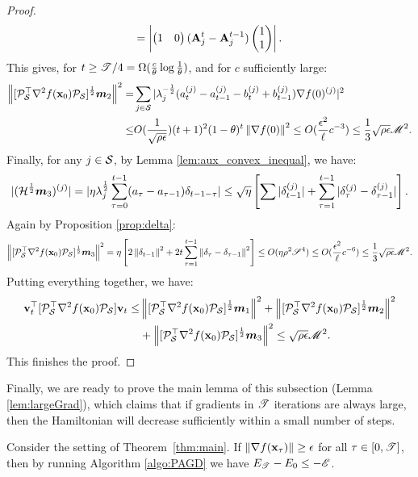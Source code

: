 \begin{proof}
\begin{align*}
= \abs{\pmat{1 & 0}  (\A_j^t -\A_j^{t-1})  \pmat{1 \\ 1}}.
\end{align*}
This gives, for $t\ge \utime/4 = \Omega(\frac{c}{\theta}\log\frac{1}{\theta})$, and
for $c$ sufficiently large:
\begin{align*}
\norm{[\proj_\S\trans \hess f(\x_0) \proj_\S]^{\frac{1}{2}}\m_2}^2 
=& \sum_{j \in \S} |\lambda_j^{-\frac{1}{2}} (a^{(j)}_t -a^{(j)}_{t-1} - b^{(j)}_t +b^{(j)}_{t-1} )  \grad f(0)^{(j)}|^2 \\
\le& O(\frac{1}{\sqrt{\rho\epsilon}})(t+1)^2(1-\theta)^t \norm{\grad f(0)}^2 \le O(\frac{\epsilon^2}{\ell}c^{-3}) \le \frac{1}{3}\sqrt{\rho\epsilon}\umom^2.
\end{align*}
Finally, for any $j \in \S$, by Lemma \ref{lem:aux_convex_inequal}, we have:
\begin{equation*}
|(\H^{\frac{1}{2}}\m_3)^{(j)}| = |\eta\lambda_j^{\frac{1}{2}}\sum_{\tau = 0}^{t-1}(a_\tau - a_{\tau -1}) \delta_{t-1-\tau}|
\le \sqrt{\eta} \left[\sum|\delta^{(j)}_{t-1}|+  \sum_{\tau=1}^{t-1} |\delta^{(j)}_\tau - \delta^{(j)}_{\tau-1}|\right].
\end{equation*}
Again by Proposition \ref{prop:delta}:
\begin{align*}
\norm{[\proj_\S\trans \hess f(\x_0) \proj_\S]^{\frac{1}{2}}\m_3}^2 
= \eta \left[2\norm{\delta_{t-1}}^2 + 2t\sum_{\tau = 1}^{t-1}\norm{\delta_\tau- \delta_{\tau-1}}^2 \right]
\le O(\eta\rho^2\uspace^4) \le O(\frac{\epsilon^2}{\ell}c^{-6}) \le \frac{1}{3}\sqrt{\rho\epsilon}\umom^2.
\end{align*}
Putting everything together, we have:
\begin{align*}
\v_t\trans [\proj_\S\trans \hess f(\x_0) \proj_\S] \v_t \le& 
\norm{[\proj_\S\trans \hess f(\x_0) \proj_\S]^{\frac{1}{2}}\m_1}^2
+ \norm{[\proj_\S\trans \hess f(\x_0) \proj_\S]^{\frac{1}{2}}\m_2}^2\\
&+ \norm{[\proj_\S\trans \hess f(\x_0) \proj_\S]^{\frac{1}{2}}\m_3}^2
\le \sqrt{\rho\epsilon}\umom^2.
\end{align*}
This finishes the proof.
\end{proof}


Finally, we are ready to prove the main lemma of this subsection (Lemma \ref{lem:largeGrad}), which claims that if gradients in $\utime$ iterations are always large, then the Hamiltonian will decrease sufficiently within a small number of steps.
\begingroup
\def\thetheorem{\ref{lem:largeGrad}}
\begin{lemma}
Consider the setting of Theorem~\ref{thm:main}.
If $\norm{\grad f(\x_\tau)} \ge \epsilon$ for all $ \tau \in [0, \utime]$, then by running Algorithm \ref{algo:PAGD} we have $E_{\utime} - E_0 \le -\ufun$.
\end{lemma}
\addtocounter{theorem}{-1}
\endgroup



